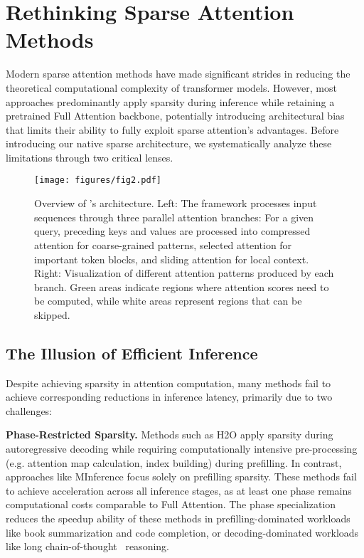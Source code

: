 \section{Rethinking Sparse Attention Methods}
\label{sec:critique}

Modern sparse attention methods have made significant strides in reducing the theoretical computational complexity of transformer models. However, most approaches predominantly apply sparsity during inference while retaining a pretrained Full Attention backbone, potentially introducing architectural bias that limits their ability to fully exploit sparse attention's advantages. Before introducing our native sparse architecture, we systematically analyze these limitations through two critical lenses.


\begin{figure*}[t] 
\centering 
\texttt{[image: figures/fig2.pdf]} 
\caption{Overview of \method{}'s architecture. Left: The framework processes input sequences through three parallel attention branches: For a given query, preceding keys and values are processed into compressed attention for coarse-grained patterns, selected attention for important token blocks, and sliding attention for local context. Right: Visualization of different attention patterns produced by each branch. Green areas indicate regions where attention scores need to be computed, while white areas represent regions that can be skipped.}
\label{fig:framework}
\end{figure*}


\subsection{The Illusion of Efficient Inference}

Despite achieving sparsity in attention computation, many methods fail to achieve corresponding reductions in inference latency, primarily due to two challenges:

\textbf{Phase-Restricted Sparsity.}
Methods such as H2O \citep{h2o} apply sparsity during autoregressive decoding while requiring computationally intensive pre-processing (e.g. attention map calculation, index building) during prefilling. In contrast, approaches like MInference \citep{minference} focus solely on prefilling sparsity. 
These methods fail to achieve acceleration across all inference stages, as at least one phase remains computational costs comparable to Full Attention.
The phase specialization reduces the speedup ability of these methods in prefilling-dominated workloads like book summarization and code completion, or decoding-dominated workloads like long chain-of-thought~\citep{cot} reasoning.


